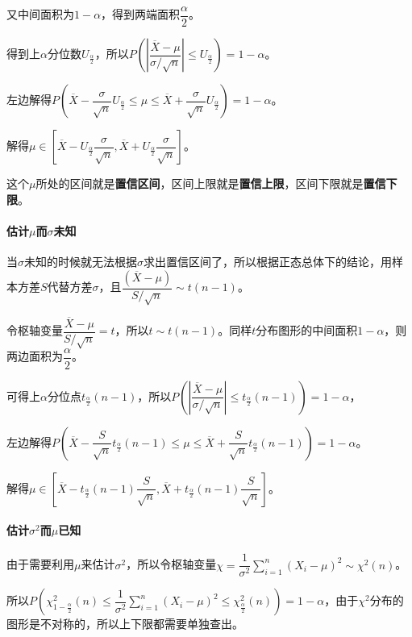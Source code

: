 又中间面积为$1-\alpha$，得到两端面积$\dfrac{\alpha}{2}$。

得到上$\alpha$分位数$U_\frac{\alpha}{2}$，所以$P\left(\left\vert\dfrac{\overline{X}-\mu}{\sigma/\sqrt{n}}\right\vert\leqslant U_\frac{\alpha}{2}\right)=1-\alpha$。

左边解得$P\left(\overline{X}-\dfrac{\sigma}{\sqrt{n}}U_\frac{\alpha}{2}\leqslant\mu\leqslant\overline{X}+\dfrac{\sigma}{\sqrt{n}}U_\frac{\alpha}{2}\right)=1-\alpha$。

解得$\mu\in[\overline{X}-U_\frac{\alpha}{2}\dfrac{\sigma}{\sqrt{n}},\overline{X}+U_\frac{\alpha}{2}\dfrac{\sigma}{\sqrt{n}}]$。

这个$\mu$所处的区间就是\textbf{置信区间}，区间上限就是\textbf{置信上限}，区间下限就是\textbf{置信下限}。

\paragraph{\texorpdfstring{估计$\mu$而$\sigma$未知}{}} \leavevmode \medskip

当$\sigma$未知的时候就无法根据$\sigma$求出置信区间了，所以根据正态总体下的结论，用样本方差$S$代替方差$\sigma$，且$\dfrac{(\overline{X}-\mu)}{S/\sqrt{n}}\sim t(n-1)$。

令枢轴变量$\dfrac{\overline{X}-\mu}{S/\sqrt{n}}=t$，所以$t\sim t(n-1)$。同样$t$分布图形的中间面积$1-\alpha$，则两边面积为$\dfrac{\alpha}{2}$。

可得上$\alpha$分位点$t_\frac{\alpha}{2}(n-1)$，所以$P\left(\left\vert\dfrac{\overline{X}-\mu}{\sigma/\sqrt{n}}\right\vert\leqslant t_\frac{\alpha}{2}(n-1)\right)=1-\alpha$，

左边解得$P\left(\overline{X}-\dfrac{S}{\sqrt{n}}t_\frac{\alpha}{2}(n-1)\leqslant\mu\leqslant\overline{X}+\dfrac{S}{\sqrt{n}}t_\frac{\alpha}{2}(n-1)\right)=1-\alpha$。

解得$\mu\in[\overline{X}-t_\frac{\alpha}{2}(n-1)\dfrac{S}{\sqrt{n}},\overline{X}+t_\frac{\alpha}{2}(n-1)\dfrac{S}{\sqrt{n}}]$。

\paragraph{\texorpdfstring{估计$\sigma^2$而$\mu$已知}{}} \leavevmode \medskip

由于需要利用$\mu$来估计$\sigma^2$，所以令枢轴变量$\chi=\dfrac{1}{\sigma^2}\sum\limits_{i=1}^n(X_i-\mu)^2\sim\chi^2(n)$。

所以$P\left(\chi^2_{1-\frac{\alpha}{2}}(n)\leqslant\dfrac{1}{\sigma^2}\sum\limits_{i=1}^n(X_i-\mu)^2\leqslant\chi^2_\frac{\alpha}{2}(n)\right)=1-\alpha$，由于$\chi^2$分布的图形是不对称的，所以上下限都需要单独查出。


